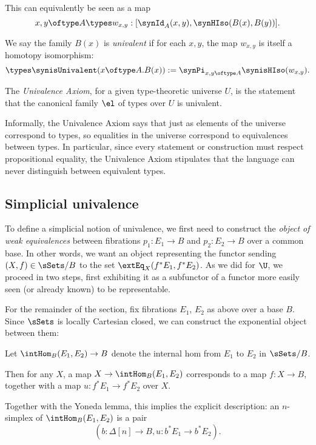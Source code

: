 This can equivalently be seen as a map
\[ x,y \oftype A \types w_{x,y} : [\synId_A(x,y), \synHIso(B(x),B(y))]. \]

\begin{definition} \label{def:type-theoretic-univalence}
We say the family $B(x)$ is \emph{univalent} if for each $x,y$, the map $w_{x,y}$ is itself a homotopy isomorphism:
\[ \types \synisUnivalent(x \oftype A . B(x)) := \synPi_{x,y \oftype A} \synisHIso(w_{x,y}). \]
\end{definition}

\begin{axiom} \label{axiom:univalence}
The \emph{Univalence Axiom}, for a given type-theoretic universe $U$, is the statement that the canonical family $\el$ of types over $U$ is univalent.
\end{axiom}

Informally, the Univalence Axiom says that just as elements of the universe correspond to types, so equalities in the universe correspond to equivalences between types.  In particular, since every statement or construction must respect propositional equality, the Univalence Axiom stipulates that the language can never distinguish between equivalent types.

\subsection{Simplicial univalence}  \label{subsec:simplicial-univalence}

To define a simplicial notion of univalence, we first need to construct the \emph{object of weak equivalences} between fibrations $p_1 \colon E_1 \to B$ and $p_2 \colon E_2 \to B$ over a common base.  In other words, we want an object representing the functor sending $(X,f) \in \sSets/B$ to the set $\extEq_X(f^*E_1,f^*E_2)$.  As we did for $\U$, we proceed in two steps, first exhibiting it as a subfunctor of a functor more easily seen (or already known) to be representable.

For the remainder of the section, fix fibrations $E_1$, $E_2$ as above over a base $B$. Since $\sSets$ is locally Cartesian closed, we can construct the exponential object between them:

\begin{definition} \label{def:internal-eq}
 Let $\intHom_B (E_1, E_2) \to B$ denote the internal hom from $E_1$ to $E_2$ in $\sSets/B$.

 Then for any $X$, a map $X \to \intHom_B (E_1,E_2)$ corresponds to a map $f \colon X \to B$, together with a map $u \colon f^*E_1 \to f^*E_2$ over $X$.

 Together with the Yoneda lemma, this implies the explicit description: an $n$-simplex of $\intHom_B (E_1,E_2)$ is a pair
 \[(b \colon \Delta[n] \to B, u \colon b^* E_1 \to b^* E_2) .\]
\end{definition}

